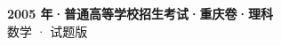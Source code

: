 \documentclass[zihao=-4, a4paper]{ctexart}
\begin{document}
\begin{center}
  {\Large\bfseries 2005 年·普通高等学校招生考试·重庆卷·理科}\\[4pt]
  {\large 数学 · 试题版}
\end{center}
\medskip
{}

\end{document}
